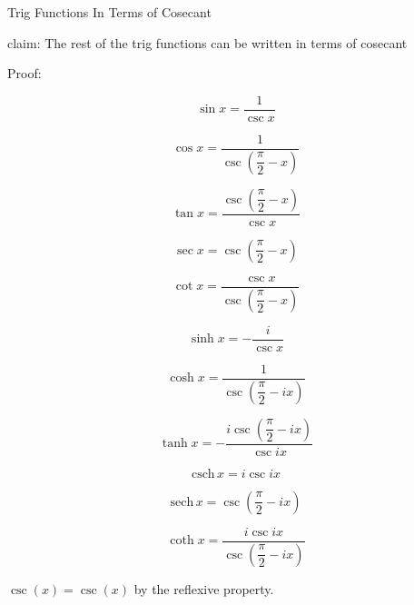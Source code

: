 \documentclass[12pt]{article}
\begin{document}
\pagebreak\begin{section}{Trig Functions In Terms of Cosecant}
	
	\noindent claim: The rest of the trig functions can be written in terms of cosecant

	\noindent Proof:

	\begin{equation}\sin x=\dfrac1{\csc x}\end{equation}

	\begin{equation}\cos x=\dfrac1{\csc\left(\dfrac\pi2-x\right)}\end{equation}

	\begin{equation}\tan x=\dfrac{\csc\left(\dfrac\pi2-x\right)}{\csc x}\end{equation}

	
	\begin{equation}\sec x=\csc\left(\dfrac\pi2-x\right)\end{equation}

	\begin{equation}\cot x=\dfrac{\csc x}{\csc\left(\dfrac\pi2-x\right)}\end{equation}


	\begin{equation}\sinh x=-\dfrac i{\csc x}\end{equation}

	\begin{equation}\cosh x=\dfrac1{\csc\left(\dfrac\pi2-ix\right)}\end{equation}

	\begin{equation}\tanh x=-\dfrac{i\csc\left(\dfrac\pi2-ix\right)}{\csc ix}\end{equation}

	\begin{equation}\text{csch}\,x=i\csc ix\end{equation}

	\begin{equation}\text{sech}\,x=\csc\left(\dfrac\pi2-ix\right)\end{equation}

	\begin{equation}\coth x=\dfrac{i\csc ix}{\csc\left(\dfrac\pi2-ix\right)}\end{equation}

	\centerline{$\csc(x)=\csc(x)$ by the reflexive property.}

	\noindent\blacksquare
\end{section}
\end{document}
